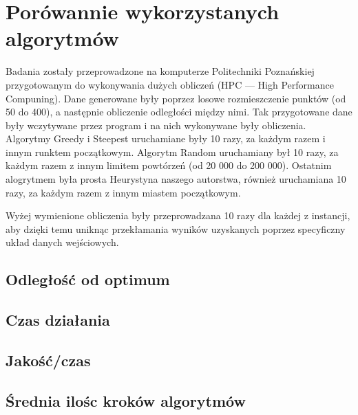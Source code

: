 \section{Porówannie wykorzystanych algorytmów}

Badania zostały przeprowadzone na komputerze Politechniki Poznańskiej przygotowanym do 
wykonywania dużych obliczeń (HPC --- High Performance Compuning). Dane generowane były 
poprzez losowe rozmieszczenie punktów (od 50 do 400), a następnie obliczenie odległości 
między nimi. Tak przygotowane dane były wczytywane przez program i na nich wykonywane były 
obliczenia. Algorytmy Greedy i Steepest uruchamiane były 10 razy, za każdym razem i innym 
runktem początkowym. Algorytm Random uruchamiany był 10 razy, za każdym razem z innym 
limitem powtórzeń (od 20 000 do 200 000). Ostatnim alogrytmem była prosta Heurystyna naszego
autorstwa, również uruchamiana 10 razy, za każdym razem z innym miastem początkowym.

Wyżej wymienione obliczenia były przeprowadzana 10 razy dla każdej z instancji, aby dzięki temu 
uniknąc przekłamania wyników uzyskanych poprzez specyficzny układ danych wejściowych.

\subsection{Odległość od optimum}

\subsection{Czas działania}

\subsection{Jakość/czas}

\subsection{Średnia ilośc kroków algorytmów}